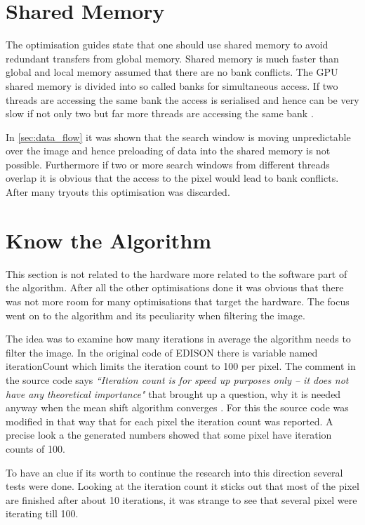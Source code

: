 \section{Shared Memory} %
\label{sec:shared_memory}
The optimisation guides state that one should use shared memory to avoid 
redundant transfers from global memory. Shared memory is much faster than global
and local memory assumed that there are no bank conflicts. The \gls{GPU} shared
memory is divided into so called banks for simultaneous access. If two threads
are accessing the same bank the access is serialised and hence can be very slow
if not only two but far more threads are accessing the same bank 
\citep{citeulike:6584051}.

In \autoref{sec:data_flow} it was shown that the search window is moving
unpredictable over the image and hence preloading of data into the shared memory
is not possible. Furthermore if two or more search windows from different
threads overlap it is obvious that the access to the pixel would lead to bank
conflicts. After many tryouts this optimisation was discarded. 

\section{Know the Algorithm} %
\label{sec:know_the_algo}
This section is not related to the hardware more related to the software part of 
the algorithm. After all the other optimisations done it was obvious that there
was not more room for many optimisations that target the hardware. The focus went
on to the algorithm and its peculiarity when filtering the image. 

The idea was to examine how many iterations in average the algorithm needs to
filter the image. In the original code of \gls{EDISON} there is variable named
\textsf{iterationCount} which limits the iteration count to 100 per pixel. The
comment in the source code says \textit{``Iteration count is for speed up
purposes only -- it does not have any theoretical importance"} that brought up a
question, why it is needed anyway when the mean shift algorithm converges
\citep{citeulike:462300}. For this the source code was modified in that way
that for each pixel the iteration count was reported. A precise look a the 
generated numbers showed that some pixel have iteration counts of 100. 

To have an clue if its worth to continue the research into this direction several
tests were done. Looking at the iteration count it sticks out that most of the 
pixel are finished after about 10 iterations, it was strange to see that several
pixel were iterating till 100. 


